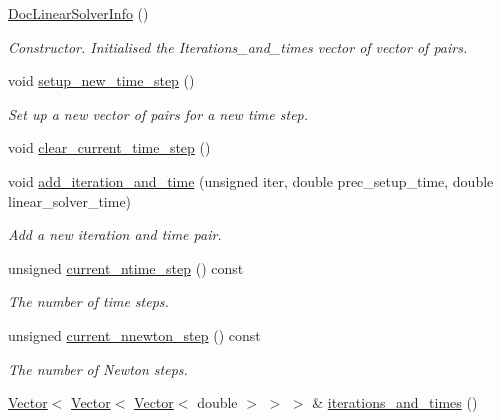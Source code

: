 \begin{DoxyCompactItemize}
\item 
\hyperlink{classoomph_1_1DocLinearSolverInfo_a9b0ce2e30cd7bb85473d1b057763cd23}{Doc\+Linear\+Solver\+Info} ()
\begin{DoxyCompactList}\small\item\em Constructor. Initialised the Iterations\+\_\+and\+\_\+times vector of vector of pairs. \end{DoxyCompactList}\item 
void \hyperlink{classoomph_1_1DocLinearSolverInfo_a09eb7f83980fc3a8e5cbd474ec1be4d4}{setup\+\_\+new\+\_\+time\+\_\+step} ()
\begin{DoxyCompactList}\small\item\em Set up a new vector of pairs for a new time step. \end{DoxyCompactList}\item 
void \hyperlink{classoomph_1_1DocLinearSolverInfo_ad7f95ceab7e3c1a07af85daa2133e08d}{clear\+\_\+current\+\_\+time\+\_\+step} ()
\item 
void \hyperlink{classoomph_1_1DocLinearSolverInfo_abc5d49fefeb08d33960af0ec729bea80}{add\+\_\+iteration\+\_\+and\+\_\+time} (unsigned iter, double prec\+\_\+setup\+\_\+time, double linear\+\_\+solver\+\_\+time)
\begin{DoxyCompactList}\small\item\em Add a new iteration and time pair. \end{DoxyCompactList}\item 
unsigned \hyperlink{classoomph_1_1DocLinearSolverInfo_ae158c6f6486fafc7a1ec900160bf4ecf}{current\+\_\+ntime\+\_\+step} () const
\begin{DoxyCompactList}\small\item\em The number of time steps. \end{DoxyCompactList}\item 
unsigned \hyperlink{classoomph_1_1DocLinearSolverInfo_a9ad2cfbfcabac912a530cf5d3e8200b1}{current\+\_\+nnewton\+\_\+step} () const
\begin{DoxyCompactList}\small\item\em The number of Newton steps. \end{DoxyCompactList}\item 
\hyperlink{classoomph_1_1Vector}{Vector}$<$ \hyperlink{classoomph_1_1Vector}{Vector}$<$ \hyperlink{classoomph_1_1Vector}{Vector}$<$ double $>$ $>$ $>$ \& \hyperlink{classoomph_1_1DocLinearSolverInfo_a355cda0ba342b60656520f56aa83d459}{iterations\+\_\+and\+\_\+times} ()

\end{DoxyCompactItemize}
